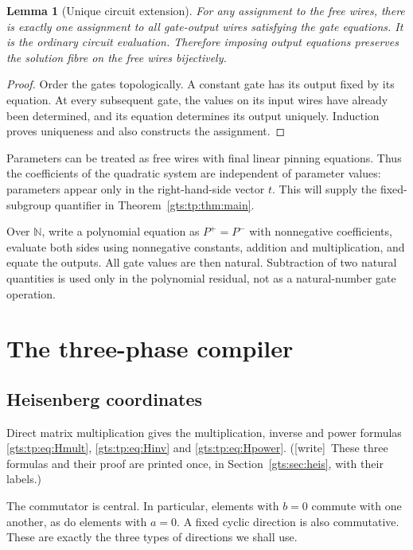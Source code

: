 \documentclass[11pt,letterpaper]{article}
\newtheorem{lemma}[theorem]{Lemma}
\theoremstyle{definition}
\theoremstyle{remark}
\newcommand{\NN}{\mathbb N}
\newcommand{\wtag}{\textup{[write]}}
\begin{document}
\begin{lemma}[Unique circuit extension]\label{gts:tp:lem:circuit}
For any assignment to the free wires, there is exactly one assignment to
all gate-output wires satisfying the gate equations. It is the ordinary
circuit evaluation. Therefore imposing output equations preserves the
solution fibre on the free wires bijectively.
\end{lemma}
\begin{proof}
Order the gates topologically. A constant gate has its output fixed by its
equation. At every subsequent gate, the values on its input wires have
already been determined, and its equation determines its output uniquely.
Induction proves uniqueness and also constructs the assignment.
\end{proof}

Parameters can be treated as free wires with final linear pinning equations.
Thus the coefficients of the quadratic system are independent of parameter
values: parameters appear only in the right-hand-side vector $t$. This will
supply the fixed-subgroup quantifier in Theorem~\ref{gts:tp:thm:main}.

Over $\NN$, write a polynomial equation as $P^+=P^-$ with nonnegative
coefficients, evaluate both sides using nonnegative constants, addition and
multiplication, and equate the outputs. All gate values are then natural.
Subtraction of two natural quantities is used only in the polynomial
residual, not as a natural-number gate operation.

\section{The three-phase compiler}
\label{gts:tp:sec:compiler}

\subsection{Heisenberg coordinates}
Direct matrix multiplication gives the multiplication, inverse and power formulas \eqref{gts:tp:eq:Hmult}, \eqref{gts:tp:eq:Hinv} and \eqref{gts:tp:eq:Hpower}. (\wtag\ These three formulas and their proof are printed once, in Section~\ref{gts:sec:heis}, with their labels.)

The commutator is central. In particular, elements with $b=0$ commute with
one another, as do elements with $a=0$. A fixed cyclic direction is also
commutative. These are exactly the three types of directions we shall use.
\end{document}
